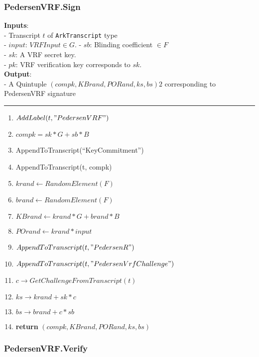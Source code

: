 \documentclass[
]{article}
\providecommand{\tightlist}{%
  \setlength{\itemsep}{0pt}\setlength{\parskip}{0pt}}
\begin{document}
\hypertarget{pedersenvrf.sign}{%
\subsubsection{PedersenVRF.Sign}\label{pedersenvrf.sign}}

\textbf{Inputs}:\\
- Transcript \(t\) of \texttt{ArkTranscript} type\\
- \(input\): \(VRFInput \in G\). - \(sb\): Blinding coefficient
\(\in F\)\\
- \(sk\): A VRF secret key.\\
- \(pk\): VRF verification key corresponds to \(sk\).\\
\textbf{Output}:\\
- A Quintuple \((compk, KBrand, PORand, ks, bs)2\) corresponding to
PedersenVRF signature

\begin{center}\rule{0.5\linewidth}{0.5pt}\end{center}

\begin{enumerate}
\def\labelenumi{\arabic{enumi}.}
\tightlist
\item
  \(AddLabel(t, "PedersenVRF")\)
\item
  \(compk = sk*G + sb*B\)
\item
  AppendToTranscript(``KeyCommitment'')
\item
  AppendToTranscript(t, compk)
\item
  \(krand \leftarrow RandomElement(F)\)
\item
  \(brand \leftarrow RandomElement(F)\)
\item
  \(KBrand \leftarrow krand * G + brand * B\)
\item
  \(POrand \leftarrow krand * input\)
\item
  \(AppendToTranscript(t, "Pedersen R")\)
\item
  \(AppendToTranscript(t, "PedersenVrfChallenge")\)
\item
  \(c \rightarrow GetChallengeFromTranscript(t)\)
\item
  \(ks \rightarrow krand + sk * c\)
\item
  \(bs \rightarrow brand + c * sb\)
\item
  \textbf{return} \((compk, KBrand, PORand, ks, bs)\)
\end{enumerate}

\hypertarget{pedersenvrf.verify}{%
\subsubsection{PedersenVRF.Verify}\label{pedersenvrf.verify}}
\end{document}
